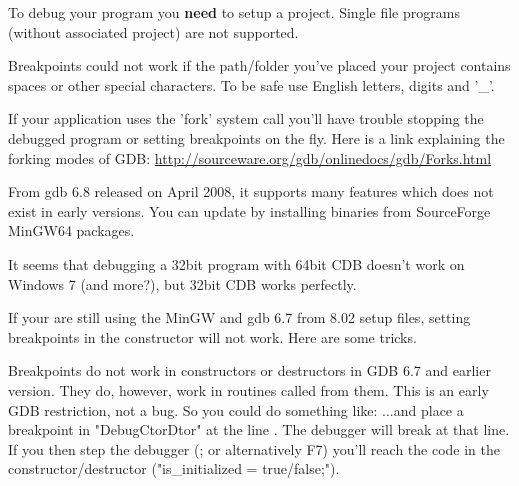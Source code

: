 
To debug your program you \textbf{need} to setup a project. Single file programs (without associated project) are not supported.


Breakpoints could not work if the path/folder you've placed your project contains spaces or other special characters. To be safe use English letters, digits and '\_'.


If your application uses the 'fork' system call you'll have trouble stopping the debugged program or setting breakpoints on the fly. Here is a link explaining the forking modes of GDB: \url{http://sourceware.org/gdb/onlinedocs/gdb/Forks.html}


From gdb 6.8 released on April 2008, it supports many features which does not exist in early versions. You can update by installing binaries from SourceForge MinGW64 packages.


It seems that debugging a 32bit program with 64bit CDB doesn't work on Windows 7 (and more?), but 32bit CDB works perfectly.



If your are still using the MinGW and gdb 6.7 from 8.02 setup files, setting breakpoints in the constructor will not work. Here are some tricks.

Breakpoints do not work in constructors or destructors in GDB 6.7 and earlier version. They do, however, work in routines called from them. This is an early GDB restriction, not a bug. So you could do something like: 
...and place a breakpoint in "DebugCtorDtor" at the line . The debugger will break at that line. If you then step the debugger (; or alternatively F7) you'll reach the code in the constructor/destructor ("is\_initialized = true/false;"). 
